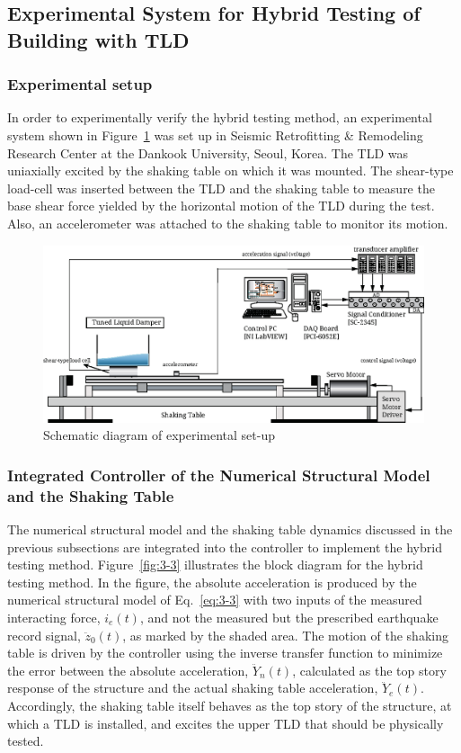 \subsection{Experimental System for Hybrid Testing of Building with TLD}
\subsubsection{Experimental setup}

In order to experimentally verify the hybrid testing method, an experimental system shown in Figure~\ref{fig:3-2} was set up in Seismic Retrofitting \& Remodeling Research Center at the Dankook University, Seoul, Korea. The TLD was uniaxially excited by the shaking table on which it was mounted. The shear-type load-cell was inserted between the TLD and the shaking table to measure the base shear force yielded by the horizontal motion of the TLD during the test. Also, an accelerometer was attached to the shaking table to monitor its motion.

\begin{figure}[ht]
\centering
\includegraphics[scale =1] {figure/3-2.eps}
\caption{Schematic diagram of experimental set-up}
\label{fig:3-2}
\end{figure}

\subsubsection{Integrated Controller of the Numerical Structural Model and the Shaking Table}
The numerical structural model and the shaking table dynamics discussed in the previous subsections are integrated into the controller to implement the hybrid testing method. Figure~\ref{fig:3-3} illustrates the block diagram for the hybrid testing method. In the figure, the absolute acceleration is produced by the numerical structural model of Eq.~\eqref{eq:3-3} with two inputs of the measured interacting force, $i_{e}(t)$, and not the measured but the prescribed earthquake record signal, $\ddot{z}_{0}(t)$, as marked by the shaded area. The motion of the shaking table is driven by the controller using the inverse transfer function to minimize the error between the absolute acceleration, $\ddot{Y}_{n}(t)$, calculated as the top story response of the structure and the actual shaking table acceleration, $\ddot{Y}_{e}(t)$. Accordingly, the shaking table itself behaves as the top story of the structure, at which a TLD is installed, and excites the upper TLD that should be physically tested.

